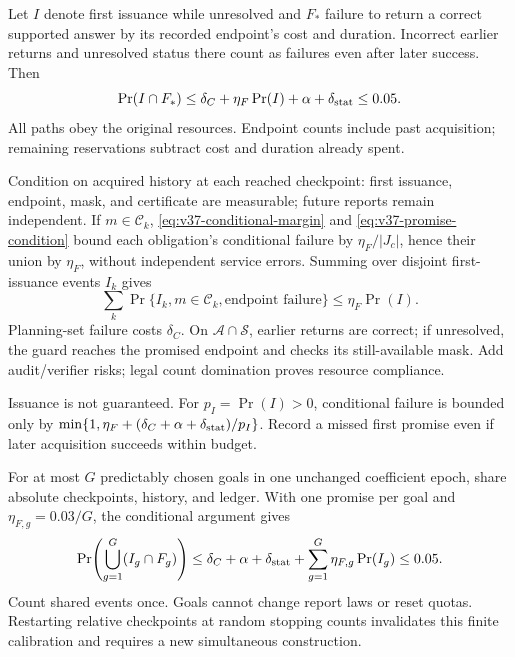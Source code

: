 \begin{theorem}
\label{thm:v37-online-promise}
Let $I$ denote first issuance while unresolved and $F_*$ failure to return a correct supported answer by its recorded endpoint's cost and duration. Incorrect earlier returns and unresolved status there count as failures even after later success. Then
$$\Pr(I\cap F_*)\leq\delta_C+\eta_F\Pr(I)+\alpha+\delta_{\rm stat}\leq0.05.$$
All paths obey the original resources. Endpoint counts include past acquisition; remaining reservations subtract cost and duration already spent.
\end{theorem}
\begin{IEEEproof}
Condition on acquired history at each reached checkpoint: first issuance, endpoint, mask, and certificate are measurable; future reports remain independent. If $m\in\mathcal C_k$, \eqref{eq:v37-conditional-margin} and \eqref{eq:v37-promise-condition} bound each obligation's conditional failure by $\eta_F/|J_c|$, hence their union by $\eta_F$, without independent service errors. Summing over disjoint first-issuance events $I_k$ gives
$$\sum_k\Pr\{I_k,m\in\mathcal C_k,\text{endpoint failure}\}\leq\eta_F\Pr(I).$$
Planning-set failure costs $\delta_C$. On $\mathcal A\cap\mathcal S$, earlier returns are correct; if unresolved, the guard reaches the promised endpoint and checks its still-available mask. Add audit/verifier risks; legal count domination proves resource compliance.
\end{IEEEproof}
Issuance is not guaranteed. For $p_I=\Pr(I)>0$, conditional failure is bounded only by $\min\{1,\eta_F+(\delta_C+\alpha+\delta_{\rm stat})/p_I\}$. Record a missed first promise even if later acquisition succeeds within budget.

For at most $G$ predictably chosen goals in one unchanged coefficient epoch, share absolute checkpoints, history, and ledger. With one promise per goal and $\eta_{F,g}=0.03/G$, the conditional argument gives
$$\Pr\!\left(\bigcup_{g=1}^G(I_g\cap F_g)\right)
\leq\delta_C+\alpha+\delta_{\rm stat}
 +\sum_{g=1}^G\eta_{F,g}\Pr(I_g)\leq0.05.$$
Count shared events once. Goals cannot change report laws or reset quotas. Restarting relative checkpoints at random stopping counts invalidates this finite calibration and requires a new simultaneous construction.
